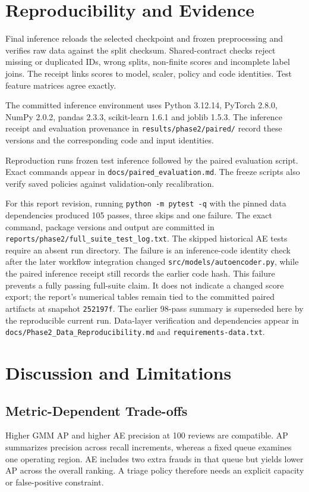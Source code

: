 \documentclass[conference]{IEEEtran}
\newcommand{\artifact}[1]{{\footnotesize\nolinkurl{#1}}}
\begin{document}
\section{Reproducibility and Evidence}
Final inference reloads the selected checkpoint and frozen preprocessing and verifies raw data against the split checksum. Shared-contract checks reject missing or duplicated IDs, wrong splits, non-finite scores and incomplete label joins. The receipt links scores to model, scaler, policy and code identities. Test feature matrices agree exactly.

The committed inference environment uses Python 3.12.14, PyTorch 2.8.0, NumPy 2.0.2, pandas 2.3.3, scikit-learn 1.6.1 and joblib 1.5.3. The inference receipt and evaluation provenance in \artifact{results/phase2/paired/} record these versions and the corresponding code and input identities.

Reproduction runs frozen test inference followed by the paired evaluation script. Exact commands appear in \artifact{docs/paired_evaluation.md}. The freeze scripts also verify saved policies against validation-only recalibration.

For this report revision, running \texttt{python -m pytest -q} with the pinned data dependencies produced 105 passes, three skips and one failure. The exact command, package versions and output are committed in \artifact{reports/phase2/full_suite_test_log.txt}. The skipped historical AE tests require an absent run directory. The failure is an inference-code identity check after the later workflow integration changed \artifact{src/models/autoencoder.py}, while the paired inference receipt still records the earlier code hash. This failure prevents a fully passing full-suite claim. It does not indicate a changed score export; the report's numerical tables remain tied to the committed paired artifacts at snapshot \texttt{252197f}. The earlier 98-pass summary is superseded here by the reproducible current run. Data-layer verification and dependencies appear in \artifact{docs/Phase2_Data_Reproducibility.md} and \artifact{requirements-data.txt}.

\section{Discussion and Limitations}
\subsection{Metric-Dependent Trade-offs}
Higher GMM AP and higher AE precision at 100 reviews are compatible. AP summarizes precision across recall increments, whereas a fixed queue examines one operating region. AE includes two extra frauds in that queue but yields lower AP across the overall ranking. A triage policy therefore needs an explicit capacity or false-positive constraint.
\end{document}
